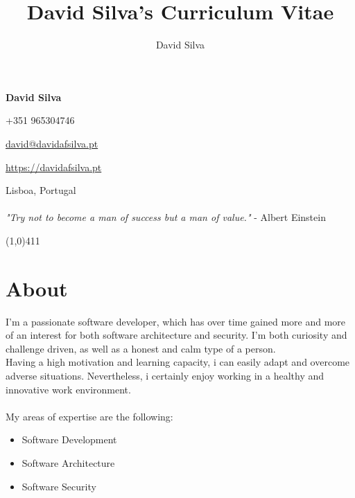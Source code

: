 \documentclass[10pt]{article}
\title{David Silva's Curriculum Vitae}
\author{David Silva}
\newenvironment{listing}{
 \begin{itemize}
  \setlength{\itemsep}{1pt}
  \setlength{\parskip}{0pt}
  \setlength{\parsep}{0pt}
}{\end{itemize}}
\begin{document}
\pagestyle{fancy}

\begin{minipage}[ht]{0.46\textwidth}
	\vspace{-5mm}\Huge{\textbf{David Silva}}
\end{minipage}
\begin{minipage}[ht]{0.46\textwidth}
\hfill +351 965304746

\hfill \href{mailto:david@davidafsilva.pt}{david@davidafsilva.pt}

\hfill \url{https://davidafsilva.pt}
\end{minipage}

\begin{minipage}[ht]{0.925\textwidth}
\vspace{-3mm} Lisboa, Portugal\\\\
\vspace{0 mm} \hfill\footnotesize{
    \textit{"Try not to become a man of success but a man of value."} - Albert Einstein
}
\vspace{0.5mm}
\end{minipage}

\line(1,0){411}
\vspace{2em}

\section*{About}
I'm a passionate software developer, which has over time gained more and more of an interest for both software architecture and security.
I'm both curiosity and challenge driven, as well as a honest and calm type of a person.\\
Having a high motivation and learning capacity, i can easily adapt and overcome adverse situations. Nevertheless, i certainly enjoy working in a healthy and innovative work environment.\\\\
My areas of expertise are the following:
\begin{listing}
	\item Software Development
	\item Software Architecture
	\item Software Security
\end{listing}
\end{document}
